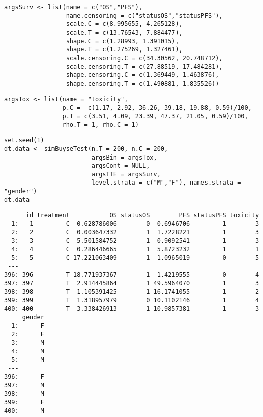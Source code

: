 \documentclass[12pt]{article}
\begin{document}
\lstset{language=r,label= ,caption= ,captionpos=b,numbers=none}
\begin{lstlisting}
argsSurv <- list(name = c("OS","PFS"),
                 name.censoring = c("statusOS","statusPFS"),
                 scale.C = c(8.995655, 4.265128),
                 scale.T = c(13.76543, 7.884477),
                 shape.C = c(1.28993, 1.391015),
                 shape.T = c(1.275269, 1.327461),
                 scale.censoring.C = c(34.30562, 20.748712),
                 scale.censoring.T = c(27.88519, 17.484281),
                 shape.censoring.C = c(1.369449, 1.463876),
                 shape.censoring.T = c(1.490881, 1.835526))
\end{lstlisting}

\lstset{language=r,label= ,caption= ,captionpos=b,numbers=none}
\begin{lstlisting}
argsTox <- list(name = "toxicity",
                p.C =  c(1.17, 2.92, 36.26, 39.18, 19.88, 0.59)/100,
                p.T = c(3.51, 4.09, 23.39, 47.37, 21.05, 0.59)/100,
                rho.T = 1, rho.C = 1)
\end{lstlisting}

\lstset{language=r,label= ,caption= ,captionpos=b,numbers=none}
\begin{lstlisting}
set.seed(1)
dt.data <- simBuyseTest(n.T = 200, n.C = 200,
                        argsBin = argsTox,
                        argsCont = NULL,
                        argsTTE = argsSurv,
                        level.strata = c("M","F"), names.strata = "gender")
dt.data
\end{lstlisting}

\begin{verbatim}
      id treatment           OS statusOS        PFS statusPFS toxicity
  1:   1         C  0.628786006        0  0.6946706         1        3
  2:   2         C  0.003647332        1  1.7228221         1        3
  3:   3         C  5.501584752        1  0.9092541         1        3
  4:   4         C  0.286446665        1  5.8723232         1        1
  5:   5         C 17.221063409        1  1.0965019         0        5
 ---                                                                  
396: 396         T 18.771937367        1  1.4219555         0        4
397: 397         T  2.914445864        1 49.5964070         1        3
398: 398         T  1.105391425        1 16.1741055         1        2
399: 399         T  1.318957979        0 10.1102146         1        4
400: 400         T  3.338426913        1 10.9857381         1        3
     gender
  1:      F
  2:      F
  3:      M
  4:      M
  5:      M
 ---       
396:      F
397:      M
398:      M
399:      F
400:      M
\end{verbatim}
\end{document}
